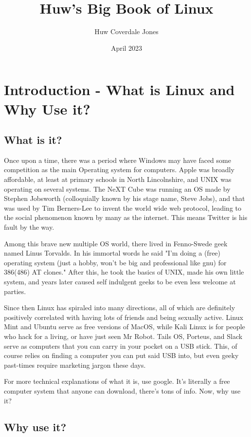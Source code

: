 \documentclass{book}
\title{Huw's Big Book of Linux}
\author{Huw Coverdale Jones}
\date{April 2023}
\begin{document}
\maketitle
\tableofcontents


\chapter{Introduction - What is
Linux and Why Use it?}

\section{What is it?}
Once upon a time, there was a period where Windows may have faced some competition as the main Operating system for computers. Apple was broadly affordable, at least at primary schools in North Lincolnshire, and UNIX was operating on several systems. The NeXT Cube was running an OS made by Stephen Jobsworth (colloquially known by his stage name, Steve Jobs), and that was used by Tim Berners-Lee to invent the world wide web protocol, leading to the social phenomenon known by many as the internet. This means Twitter is his fault by the way.

Among this brave new multiple OS world, there lived in Fenno-Swede geek named Linus Torvalds. In his immortal words he said "I'm doing a (free) operating system (just a hobby, won't be big and professional like gnu) for 386(486) AT clones." After this, he took the basics of UNIX, made his own little system, and years later caused self indulgent geeks to be even less welcome at parties. 

Since then Linux has spiraled into many directions, all of which are definitely positively correlated with having lots of friends and being sexually active. Linux Mint and Ubuntu serve as free versions of MacOS, while Kali Linux is for people who hack for a living, or have just seen Mr Robot. Tails OS, Porteus, and Slack serve as computers that you can carry in your pocket on a USB stick. This, of course relies on finding a computer you can put said USB into, but even geeky past-times require marketing jargon these days.

For more technical explanations of what it is, use google. It's literally a free computer system that anyone can download, there's tons of info. Now, why use it?

\section{Why use it?}
\end{document}
